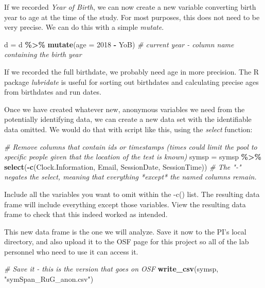 \documentclass[
  12pt,
]{book}
\newenvironment{Shaded}{\begin{snugshade}}{\end{snugshade}}
\newcommand{\AttributeTok}[1]{\textcolor[rgb]{0.13,0.29,0.53}{#1}}
\newcommand{\CommentTok}[1]{\textcolor[rgb]{0.56,0.35,0.01}{\textit{#1}}}
\newcommand{\DecValTok}[1]{\textcolor[rgb]{0.00,0.00,0.81}{#1}}
\newcommand{\FunctionTok}[1]{\textcolor[rgb]{0.13,0.29,0.53}{\textbf{#1}}}
\newcommand{\NormalTok}[1]{#1}
\newcommand{\OtherTok}[1]{\textcolor[rgb]{0.56,0.35,0.01}{#1}}
\newcommand{\SpecialCharTok}[1]{\textcolor[rgb]{0.81,0.36,0.00}{\textbf{#1}}}
\newcommand{\StringTok}[1]{\textcolor[rgb]{0.31,0.60,0.02}{#1}}
\begin{document}
If we recorded \emph{Year of Birth}, we can now create a new variable converting birth year to age at the time of the study. For most purposes, this does not need to be very precise. We can do this with a simple \emph{mutate}.

\begin{Shaded}
\begin{Highlighting}[]
\NormalTok{d }\OtherTok{=}\NormalTok{ d }\SpecialCharTok{\%\textgreater{}\%} \FunctionTok{mutate}\NormalTok{(}\AttributeTok{age =} \DecValTok{2018} \SpecialCharTok{{-}}\NormalTok{ YoB) }\CommentTok{\# current year {-} column name containing the birth year}
\end{Highlighting}
\end{Shaded}

If we recorded the full birthdate, we probably need age in more precision. The R package \emph{lubridate} is useful for sorting out birthdates and calculating precise ages from birthdates and run dates.

Once we have created whatever new, anonymous variables we need from the potentially identifying data, we can create a new data set with the identifiable data omitted. We would do that with script like this, using the \emph{select} function:

\begin{Shaded}
\begin{Highlighting}[]
\CommentTok{\# Remove columns that contain ids or timestamps (times could limit the pool to specific people given that the location of the test is known)}
\NormalTok{symsp }\OtherTok{=}\NormalTok{ symsp }\SpecialCharTok{\%\textgreater{}\%} \FunctionTok{select}\NormalTok{(}\SpecialCharTok{{-}}\FunctionTok{c}\NormalTok{(Clock.Information, Email, SessionDate, SessionTime)) }\CommentTok{\# The "{-}" negates the select, meaning that everything *except* the named columns remain.}
\end{Highlighting}
\end{Shaded}

Include all the variables you want to omit within the -c() list. The resulting data frame will include everything except those variables. View the resulting data frame to check that this indeed worked as intended.

This new data frame is the one we will analyze. Save it now to the PI's local directory, and also upload it to the OSF page for this project so all of the lab personnel who need to use it can access it.

\begin{Shaded}
\begin{Highlighting}[]
\CommentTok{\# Save it {-} this is the version that goes on OSF}
\FunctionTok{write\_csv}\NormalTok{(symsp, }\StringTok{"symSpan\_RuG\_anon.csv"}\NormalTok{)}
\end{Highlighting}
\end{Shaded}
\end{document}
